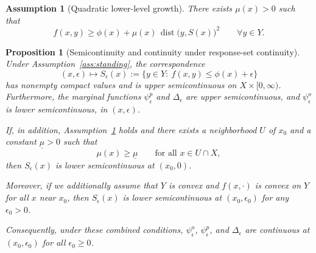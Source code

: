 \documentclass[10pt,a4paper]{amsart}
\newtheorem{assumption}{Assumption}
\newtheorem{proposition}{Proposition}
\DeclareMathOperator{\dist}{dist}
\newcommand{\eps}{\epsilon}
\begin{document}
\begin{assumption}[Quadratic lower-level growth]\label{ass:qg}
There exists $\mu(x)>0$ such that
\begin{equation}\label{eq:qg}
  f(x,y)\ge \phi(x)+\mu(x)\,\dist\bigl(y,S(x)\bigr)^2
  \qquad \forall y\in Y.
\end{equation}
\end{assumption}

\begin{proposition}[Semicontinuity and continuity under response-set
continuity]\label{prop:continuity}
Under Assumption~\ref{ass:standing}, the correspondence
\[
(x,\eps)\longmapsto S_\eps(x):=\{y\in Y:\ f(x,y)\le \phi(x)+\eps\}
\]
has nonempty compact values and is upper semicontinuous on
$X\times[0,\infty)$. Furthermore, the marginal functions
$\psi_\eps^p$ and $\Delta_\eps$ are upper semicontinuous, and
$\psi_\eps^o$ is lower semicontinuous, in $(x,\eps)$.

If, in addition, Assumption~\ref{ass:qg} holds and there exists a
neighborhood $U$ of $x_0$ and a constant $\underline\mu>0$ such
that
\[
\mu(x)\ge \underline\mu\qquad \text{for all }x\in U\cap X,
\]
then $S_\eps(x)$ is lower semicontinuous at $(x_0,0)$.

Moreover, if we additionally assume that $Y$ is convex and
$f(x,\cdot)$ is convex on $Y$ for all $x$ near $x_0$, then
$S_\eps(x)$ is lower semicontinuous at $(x_0,\eps_0)$ for any
$\eps_0>0$.

Consequently, under these combined conditions,
$\psi_\eps^o$, $\psi_\eps^p$, and $\Delta_\eps$ are continuous at
$(x_0,\eps_0)$ for all $\eps_0\ge 0$.
\end{proposition}
\end{document}
